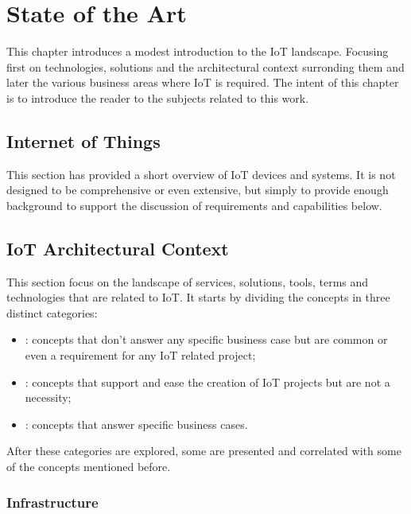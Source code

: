 \chapter{State of the Art}
\label{chap:stateofart}

This chapter introduces a modest introduction to the \gls{IoT} landscape. Focusing first on technologies, solutions and the architectural context surronding them and later the various business areas where \gls{IoT} is required.
The intent of this chapter is to introduce the reader to the subjects related to this work.

\section{Internet of Things}
\label{sec:stateofart:iot}

This section has provided a short overview of IoT devices and systems. It is not designed to be comprehensive or even extensive, but simply to provide enough background to support the discussion of requirements and capabilities below.

\section{IoT Architectural Context}
\label{sec:stateofart:arch}

This section focus on the landscape of services, solutions, tools, terms and technologies that are related to \gls{IoT}.
It starts by dividing the concepts in three distinct categories:

\begin{itemize}
    \item {}: concepts that don't answer any specific business case but are common or even a requirement for any \gls{IoT} related project; 
    \item {}: concepts that support and ease the creation of \gls{IoT} projects but are not a necessity;
    \item {}: concepts that answer specific business cases.
\end{itemize}

After these categories are explored, some  are presented and correlated with some of the concepts mentioned before.

\subsection{Infrastructure} %
\label{subsec:stateofart:arch:infra}

